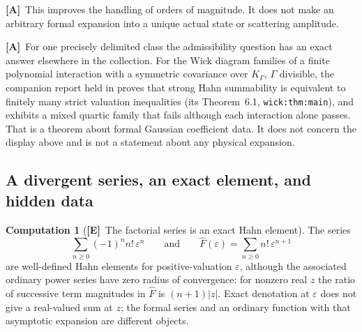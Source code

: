 \documentclass[11pt,letterpaper]{article}
\numberwithin{equation}{section}
\theoremstyle{definition}
\newtheorem{computation}[theorem]{Computation}
\theoremstyle{remark}
\newcommand{\eps}{\varepsilon}
\newcommand{\abs}[1]{\lvert#1\rvert}
\newcommand{\TE}{\textcolor{TierE}{\textsf{\bfseries[E]}}}
\newcommand{\TA}{\textcolor{TierA}{\textsf{\bfseries[A]}}}
\begin{document}
\TA\ This improves the handling of orders of magnitude. It does not make an
arbitrary formal expansion into a unique actual state or scattering amplitude.

\TA\ For one precisely delimited class the admissibility question has an exact
answer elsewhere in the collection. For the Wick diagram families of a finite
polynomial interaction with a symmetric covariance over $K_\Gamma$, $\Gamma$
divisible, the companion report held in
 proves that strong Hahn
summability is equivalent to finitely many strict valuation inequalities (its
Theorem~6.1, \texttt{wick:thm:main}), and exhibits a mixed quartic family that
fails although each interaction alone passes. That is a theorem about formal
Gaussian coefficient data. It does not concern the display above and is not a
statement about any physical expansion.

\subsection{A divergent series, an exact element, and hidden data}
\label{phys:sub:borel}

\begin{computation}[\TE\ The factorial series is an exact Hahn element]
\label{phys:comp:factorial}
The series
\begin{equation}\label{phys:eq:factorial}
\sum_{n\ge0}(-1)^{n}n!\,\eps^{n}
\qquad\text{and}\qquad
\widehat F(\eps)=\sum_{n\ge0}n!\,\eps^{n+1}
\end{equation}
are well-defined Hahn elements for positive-valuation $\eps$, although the
associated ordinary power series have zero radius of convergence: for nonzero
real $z$ the ratio of successive term magnitudes in $\widehat F$ is
$(n+1)\abs z$. Exact denotation at $\eps$ does not give a real-valued sum at
$z$; the formal series and an ordinary function with that asymptotic expansion
are different objects.
\end{computation}
\end{document}
